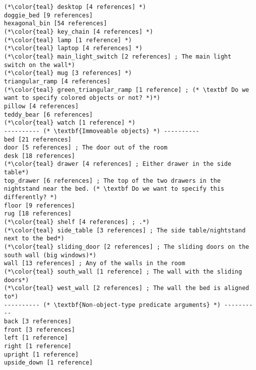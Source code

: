 \documentclass{article}
\begin{document}
\begin{lstlisting}
(*\color{teal} desktop [4 references] *)
doggie_bed [9 references] 
hexagonal_bin [54 references] 
(*\color{teal} key_chain [4 references] *)
(*\color{teal} lamp [1 reference] *)
(*\color{teal} laptop [4 references] *)
(*\color{teal} main_light_switch [2 references] ; The main light switch on the wall*)
(*\color{teal} mug [3 references] *)
triangular_ramp [4 references] 
(*\color{teal} green_triangular_ramp [1 reference] ; (* \textbf Do we want to specify colored objects or not? *)*)
pillow [4 references] 
teddy_bear [6 references] 
(*\color{teal} watch [1 reference] *)
---------- (* \textbf{Immoveable objects} *) ----------
bed [21 references] 
door [5 references] ; The door out of the room
desk [18 references] 
(*\color{teal} drawer [4 references] ; Either drawer in the side table*)
top_drawer [6 references] ; The top of the two drawers in the nightstand near the bed. (* \textbf Do we want to specify this differently? *)
floor [9 references] 
rug [18 references] 
(*\color{teal} shelf [4 references] ; .*)
(*\color{teal} side_table [3 references] ; The side table/nightstand next to the bed*)
(*\color{teal} sliding_door [2 references] ; The sliding doors on the south wall (big windows)*)
wall [13 references] ; Any of the walls in the room
(*\color{teal} south_wall [1 reference] ; The wall with the sliding doors*)
(*\color{teal} west_wall [2 references] ; The wall the bed is aligned to*)
---------- (* \textbf{Non-object-type predicate arguments} *) ----------
back [3 references] 
front [3 references] 
left [1 reference] 
right [1 reference] 
upright [1 reference] 
upside_down [1 reference] 
\end{lstlisting}
\end{document}
